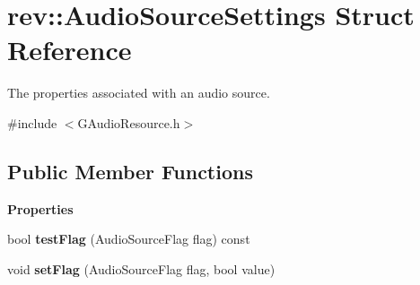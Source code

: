 \hypertarget{structrev_1_1_audio_source_settings}{}\section{rev\+::Audio\+Source\+Settings Struct Reference}
\label{structrev_1_1_audio_source_settings}


The properties associated with an audio source.  




{\ttfamily \#include $<$G\+Audio\+Resource.\+h$>$}

\subsection*{Public Member Functions}
\begin{Indent}\textbf{ Properties}\par
\begin{DoxyCompactItemize}
\item 
\mbox{\label{structrev_1_1_audio_source_settings_a94535e586b2581c216c8ad7e9f41ef89}} 
bool {\bfseries test\+Flag} (Audio\+Source\+Flag flag) const
\item 
\mbox{\label{structrev_1_1_audio_source_settings_a36457d90f64c0f4051f0c9ca476312be}} 
void {\bfseries set\+Flag} (Audio\+Source\+Flag flag, bool value)
\end{DoxyCompactItemize}
\end{Indent}
